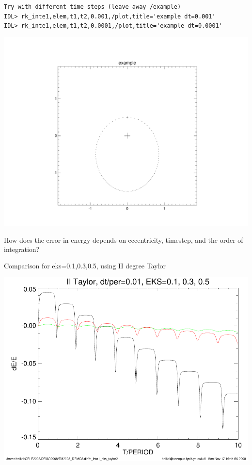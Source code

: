 \documentclass[a4paper,12pt]{article}
\def\black{\color{RGBblack}}
\begin{document}
{{{\begin{verbatim}
Try with different time steps (leave away /example)
IDL> rk_inte1,elem,t1,t2,0.001,/plot,title='example dt=0.001'
IDL> rk_inte1,elem,t1,t2,0.0001,/plot,title='example dt=0.0001'
\end{verbatim}
}
\black

\includegraphics[angle=0,width=0.35\paperwidth]{rk_inte1_example.pdf}

\newpage

\black How does the error in energy depends on eccentricity,
timestep, and the order of integration?



\vspace{1cm}
{\bf {}}
Comparison for eks=0.1,0.3,0.5, using II degree Taylor



\includegraphics[width=0.5\paperwidth]{rk_inte1_eks_taylor2.pdf}



}}
\end{document}
